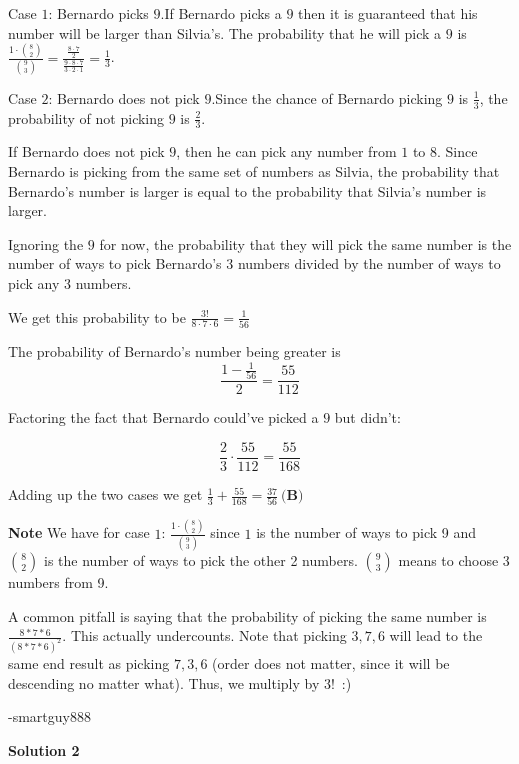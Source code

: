 \begin{enumerate}
 
Case $1$: Bernardo picks $9$.If Bernardo picks a $9$ then it is guaranteed that his number will be larger than Silvia's. The probability that he will pick a $9$ is $\frac{1 \cdot \binom{8}{2}}{\binom{9}{3}} = \frac{\frac{8\cdot7}{2}}{\frac{9\cdot8\cdot7}{3\cdot2\cdot1}}=\frac{1}{3}$.

 
Case $2$: Bernardo does not pick $9$.Since the chance of Bernardo picking $9$ is $\frac{1}{3}$, the probability of not picking $9$ is $\frac{2}{3}$.

 If Bernardo does not pick $9$, then he can pick any number from $1$ to $8$. Since Bernardo is picking from the same set of numbers as Silvia, the probability that Bernardo's number is larger is equal to the probability that Silvia's number is larger.

 Ignoring the $9$ for now, the probability that they will pick the same number is the number of ways to pick Bernardo's 3 numbers divided by the number of ways to pick any 3 numbers.

 We get this probability to be $\frac{3!}{8\cdot{7}\cdot{6}} = \frac{1}{56}$

 The probability of Bernardo's number being greater is
 \[\frac{1-\frac{1}{56}}{2} = \frac{55}{112}\]

 Factoring the fact that Bernardo could've picked a $9$ but didn't:

 
 \[\frac{2}{3}\cdot{\frac{55}{112}} = \frac{55}{168}\]

 Adding up the two cases we get $\frac{1}{3}+\frac{55}{168} = \boxed{\frac{37}{56}\ \textbf{(B)}}$

 \textbf{Note} We have for case $1$: $\frac{1 \cdot \binom{8}{2}}{\binom{9}{3}}$ since $1$ is the number of ways to pick 9 and $\binom{8}{2}$ is the number of ways to pick the other 2 numbers. $\binom{9}{3}$ means to choose 3 numbers from 9.

 A common pitfall is saying that the probability of picking the same number is $\frac{8*7*6}{(8*7*6)^2}$. This actually undercounts. Note that picking $3,7,6$ will lead to the same end result as picking $7,3,6$ (order does not matter, since it will be descending no matter what). Thus, we multiply by $3!$ :)

 -smartguy888

 



\textbf{Solution 2}


\end{enumerate}
